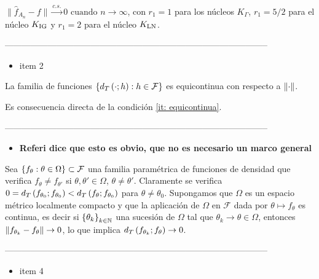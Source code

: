 $\parallel \widehat{f}_{A_n} - f\parallel \stackrel{c.s.} {\longrightarrow} 0 \text{ cuando } n \longrightarrow \infty$, con $r_1=1$ para los núcleos $K_{\Gamma}$, $r_1=5/2$ para el núcleo $K_{\tiny \text{IG}}$ y $r_1=2$ para el núcleo $K_{\tiny \text{LN}}$.

--------------------------------------------------------------------------------------------
\begin{itemize}
	\item item 2
\end{itemize}

\begin{corollary}
	La familia de funciones $\left\{ d_{T}\left( \cdot;h \right): h\in\mathcal{F} \right\}$ es equicontinua
	con respecto a $\left\| \cdot \right\|$.
\end{corollary}
\begin{dem}
	Es consecuencia directa de la condición \ref{it: equicontinua}.
\end{dem}

--------------------------------------------------------------------------------------------

\begin{itemize}
	\item \textbf{Referi dice que esto es obvio, que no es necesario un marco general}
\end{itemize}

Sea $\left\{ f_{\theta}:\theta\in\Omega \right\}\subset\mathcal{F}$ una familia paramétrica de funciones de densidad
que verifica $f_{\theta} \ne f_{\theta'}$ si $\theta,\theta'\in\Omega$, $\theta\ne\theta'$.
Claramente se verifica $0 = d_{T}\left( f_{\theta_{0}};f_{\theta_{0}} \right) < d_{T}\left( f_{\theta};f_{\theta_{0}} \right)$ para
$\theta\ne\theta_{0}$.
Supongamos que $\Omega$ es un espacio métrico localmente compacto y que la aplicación de $\Omega$
en $\mathcal{F}$ dada por $\theta\mapsto f_{\theta}$ es continua, es decir
si $\left\{ \theta_{k} \right\}_{k\in\mathbb{N}}$ una sucesión de $\Omega$ tal que
$\theta_{k}\to\theta\in\Omega$, entonces $\left\| f_{\theta_{k}}-f_{\theta} \right\|\to 0$,
lo que implica $d_{T}\left( f_{\theta_{k}};f_{\theta} \right)\to 0$.

--------------------------------------------------------------------------------------------

\begin{itemize}
	\item item 4
\end{itemize}

